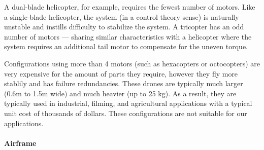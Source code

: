 A dual-blade helicopter, for example, requires the fewest number of motors. Like a single-blade helicopter, the system (in a control theory sense) is naturally unstable and instills difficulty to stabilize the system. A tricopter has an odd number of motors --- sharing similar characteristics with a helicopter where the system requires an additional tail motor to compensate for the uneven torque. 

Configurations using more than 4 motors (such as hexacopters or octocopters) are very expensive for the amount of parts they require, however they fly more stablily and has failure redundancies. These drones are typically much larger (0.6m to 1.5m wide) and much heavier (up to 25 kg). As a result, they are typically used in industrial, filming, and agricultural applications with a typical unit cost of thousands of dollars. These configurations are not suitable for our applications.

\paragraph{Airframe}

